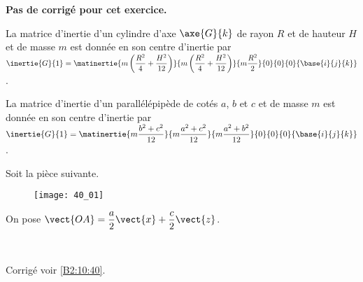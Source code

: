 \normaltrue \difficilefalse \tdifficilefalse
\correctionfalse


\setcounter{numques}{0}
\ifcorrection
\else
\textbf{Pas de corrigé pour cet exercice.}
\fi

\ifprof
\else
La matrice d'inertie d'un cylindre d'axe $\axe{G}{k}$ de rayon $R$ et de hauteur $H$ et de masse $m$ est donnée en son centre d'inertie par 
$\inertie{G}{1}=\matinertie{m\left(\dfrac{R^2}{4}+\dfrac{H^2}{12} \right)}{m\left(\dfrac{R^2}{4}+\dfrac{H^2}{12} \right)}{m\dfrac{R^2}{2}}{0}{0}{0}{\base{i}{j}{k}}$.

La matrice d'inertie d'un parallélépipède de cotés $a$, $b$ et $c$ et de masse $m$ est donnée en son centre d'inertie par 
$\inertie{G}{1}=\matinertie{m\dfrac{b^2+c^2}{12}}{m\dfrac{a^2+c^2}{12}}{m\dfrac{a^2+b^2}{12}}{0}{0}{0}{\base{i}{j}{k}}$.

Soit la pièce suivante. 
\begin{figure}[H]
\centering
\texttt{[image: 40\_01]}
\end{figure}

On pose $\vect{OA}=\dfrac{a}{2}\vect{x}+\dfrac{c}{2}\vect{z}$. 
\fi



\ifprof
\else
\fi

\ifprof ~\\
\else
\fi


\ifprof
\else
\begin{flushright}
\footnotesize{Corrigé voir \ref{B2:10:40}.}
\end{flushright}%
\fi